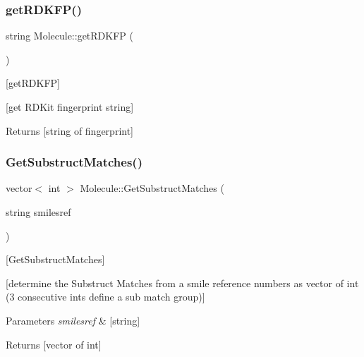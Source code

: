 \subsubsection{\texorpdfstring{get\+R\+D\+K\+F\+P()}{getRDKFP()}}
{\footnotesize\ttfamily string Molecule\+::get\+R\+D\+K\+FP (\begin{DoxyParamCaption}{ }\end{DoxyParamCaption})}



\mbox{[}get\+R\+D\+K\+FP\mbox{]} 

\mbox{[}get R\+D\+Kit fingerprint string\mbox{]}

\begin{DoxyReturn}{Returns}
\mbox{[}string of fingerprint\mbox{]} 
\end{DoxyReturn}
\mbox{\label{class_molecule_a39c84cac0833144106a6bb2a4adb3d38}} 
\subsubsection{\texorpdfstring{Get\+Substruct\+Matches()}{GetSubstructMatches()}}
{\footnotesize\ttfamily vector$<$ int $>$ Molecule\+::\+Get\+Substruct\+Matches (\begin{DoxyParamCaption}\item[{string}]{smilesref }\end{DoxyParamCaption})}



\mbox{[}Get\+Substruct\+Matches\mbox{]} 

\mbox{[}determine the Substruct Matches from a smile reference numbers as vector of int (3 consecutive ints define a sub match group)\mbox{]}


\begin{DoxyParams}{Parameters}
{\em smilesref} & \mbox{[}string\mbox{]} \\
\hline
\end{DoxyParams}
\begin{DoxyReturn}{Returns}
\mbox{[}vector of int\mbox{]} 
\end{DoxyReturn}
\mbox{\label{class_molecule_aaeb720434e1f35acf042b16d34fdfc29}} 
